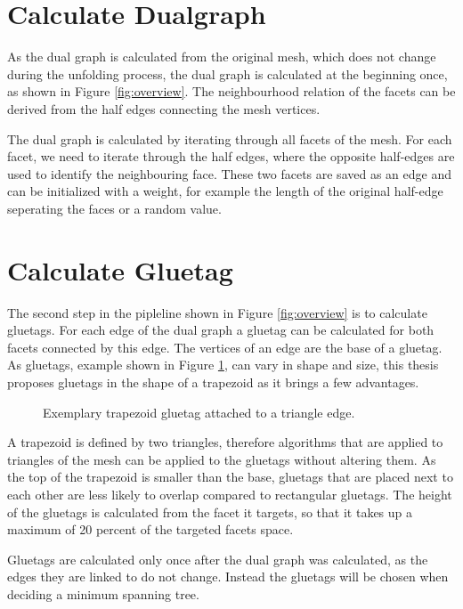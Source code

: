 \documentclass[draft,final]{vutinfth} %
\begin{document}
\section{Calculate Dualgraph}

As the dual graph is calculated from the original mesh, which does not change during the unfolding process, the dual graph is calculated at the beginning once, as shown in Figure \ref{fig:overview}. The neighbourhood relation of the facets can be derived from the half edges connecting the mesh vertices. 

The dual graph is calculated by iterating through all facets of the mesh. For each facet, we need to iterate through the half edges, where the opposite half-edges are used to identify the neighbouring face. These two facets are saved as an edge and can be initialized with a weight, for example the length of the original half-edge seperating the faces or a random value.

\section{Calculate Gluetag}

The second step in the pipleline shown in Figure \ref{fig:overview} is to calculate gluetags. For each edge of the dual graph a gluetag can be calculated for both facets connected by this edge. The vertices of an edge are the base of a gluetag. As gluetags, example shown in Figure \ref{fig:gluetag}, can vary in shape and size, this thesis proposes gluetags in the shape of a trapezoid as it brings a few advantages. 

\begin{figure}

\caption{Exemplary trapezoid gluetag attached to a triangle edge.}
\label{fig:gluetag}
\end{figure}

A trapezoid is defined by two triangles, therefore algorithms that are applied to triangles of the mesh can be applied to the gluetags without altering them. As the top of the trapezoid is smaller than the base, gluetags that are placed next to each other are less likely to overlap compared to rectangular gluetags. The height of the gluetags is calculated from the facet it targets, so that it takes up a maximum of 20 percent of the targeted facets space.

Gluetags are calculated only once after the dual graph was calculated, as the edges they are linked to do not change. Instead the gluetags will be chosen when deciding a minimum spanning tree. 
\end{document}
